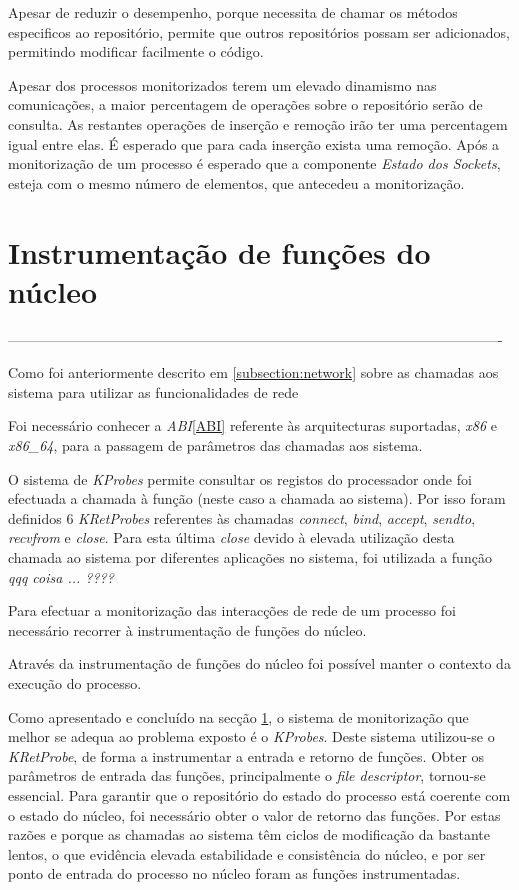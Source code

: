 Apesar de reduzir o desempenho, porque necessita de chamar os métodos especificos ao repositório, permite que outros repositórios possam ser adicionados, permitindo modificar facilmente o código.

Apesar dos processos monitorizados terem um elevado dinamismo nas comunicações, a maior percentagem de operações sobre o repositório serão de consulta.
As restantes operações de inserção e remoção irão ter uma percentagem igual entre elas.
É esperado que para cada inserção exista uma remoção.
Após a monitorização de um processo é esperado que a componente \textit{Estado dos Sockets}, esteja com o mesmo número de elementos, que antecedeu a monitorização.

\section{Instrumentação de funções do núcleo}

----------------------------------------------------------------------------------------------------------

Como foi anteriormente descrito em \ref{subsection:network} sobre as chamadas aos sistema para utilizar as funcionalidades de rede

Foi necessário conhecer a \textit{ABI}\ref{ABI}\cite{ABI} referente às arquitecturas suportadas, \textit{x86} e \textit{x86\_64}, para a passagem de parâmetros das chamadas aos sistema.

O sistema de \textit{KProbes} permite consultar os registos do processador onde foi efectuada a chamada à função (neste caso a chamada ao sistema).
 Por isso foram definidos 6 \textit{KRetProbes} referentes às chamadas \textit{connect}, \textit{bind}, \textit{accept}, \textit{sendto}, \textit{recvfrom} e
\textit{close}.
 Para esta última \textit{close} devido à elevada utilização desta chamada ao sistema por diferentes aplicações no sistema, foi utilizada a função \textit{qqq coisa ...  ????}

Para efectuar a monitorização das interacções de rede de um processo foi necessário recorrer à instrumentação de funções do núcleo.

Através da instrumentação de funções do núcleo foi possível manter o contexto da execução do processo.

Como apresentado e concluído na secção \ref{}, o sistema de monitorização que melhor se adequa ao problema exposto é o \textit{KProbes}.
 Deste sistema utilizou-se o \textit{KRetProbe}, de forma a instrumentar a entrada e retorno de funções.
 Obter os parâmetros de entrada das funções, principalmente o \textit{file descriptor}, tornou-se essencial.
 Para garantir que o repositório do estado do processo está coerente com o estado do núcleo, foi necessário obter o valor de retorno das funções.
 Por estas razões e porque as chamadas ao sistema têm ciclos de modificação da bastante lentos, o que evidência elevada estabilidade e consistência do núcleo, e por ser ponto de entrada do processo no núcleo foram as funções instrumentadas.

